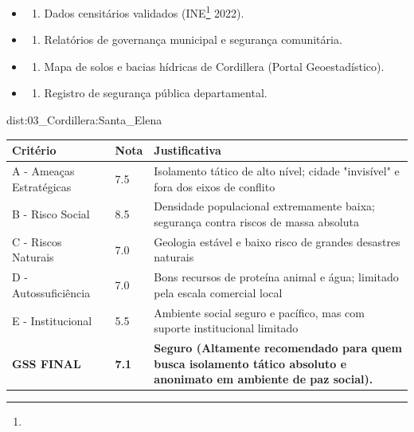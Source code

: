 {\begin{itemize}
\tightlist
\item
  \begin{enumerate}
  \def\labelenumi{\arabic{enumi})}
  \tightlist
  \item
    Dados censitários validados (INE\footnote{\fineINE} 2022).
  \end{enumerate}
\item
  \begin{enumerate}
  \def\labelenumi{\arabic{enumi})}
  \setcounter{enumi}{1}
  \tightlist
  \item
    Relatórios de governança municipal e segurança comunitária.
  \end{enumerate}
\item
  \begin{enumerate}
  \def\labelenumi{\arabic{enumi})}
  \setcounter{enumi}{2}
  \tightlist
  \item
    Mapa de solos e bacias hídricas de Cordillera (Portal
    Geoestadístico).
  \end{enumerate}
\item
  \begin{enumerate}
  \def\labelenumi{\arabic{enumi})}
  \setcounter{enumi}{3}
  \tightlist
  \item
    Registro de segurança pública departamental.
  \end{enumerate}
\end{itemize}}{dist:03_Cordillera:Santa_Elena}
\begin{table}[ht!]
\small \begin{tabular}{p{3.0cm}p{0.8cm}p{6.0cm}} \toprule
\textbf{Critério} & \textbf{Nota} & \textbf{Justificativa} \\ \midrule
A - Ameaças Estratégicas & 7.5 & Isolamento tático de alto nível; cidade "invisível" e fora dos eixos de conflito \\
B - Risco Social & 8.5 & Densidade populacional extremamente baixa; segurança contra riscos de massa absoluta \\
C - Riscos Naturais & 7.0 & Geologia estável e baixo risco de grandes desastres naturais \\
D - Autossuficiência & 7.0 & Bons recursos de proteína animal e água; limitado pela escala comercial local \\
E - Institucional & 5.5 & Ambiente social seguro e pacífico, mas com suporte institucional limitado \\
\midrule \textbf{GSS FINAL} & \textbf{7.1} & \textbf{Seguro (Altamente recomendado para quem busca isolamento tático absoluto e anonimato em ambiente de paz social).} \\ \bottomrule \end{tabular}
\end{table}
